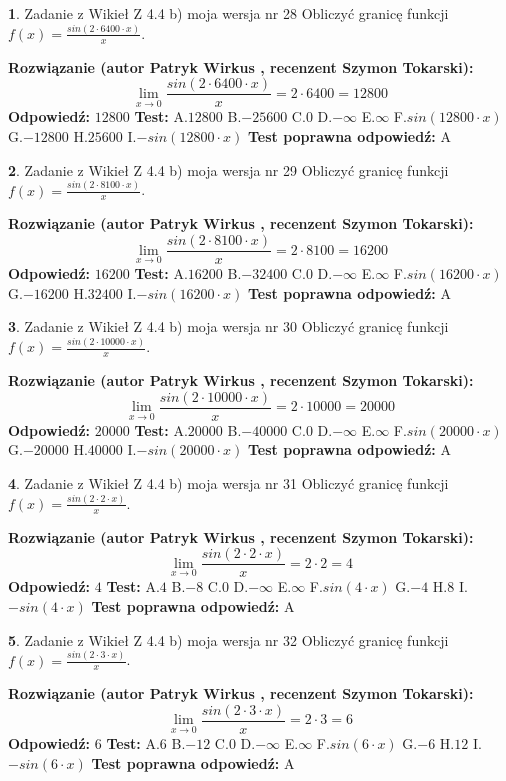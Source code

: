 \documentclass[12pt, a4paper]{article}
\theoremstyle{definition} %
\newtheorem{zad}{}
\newcommand{\zadStart}[1]{\begin{zad}#1\newline}
\newcommand{\zadStop}{\end{zad}}
\newcommand{\rozwStart}[2]{\noindent \textbf{Rozwiązanie (autor #1 , recenzent #2): }\newline}
\newcommand{\rozwStop}{\newline}
\newcommand{\odpStart}{\noindent \textbf{Odpowiedź:}\newline}
\newcommand{\odpStop}{\newline}
\newcommand{\testStart}{\noindent \textbf{Test:}\newline}
\newcommand{\testStop}{\newline}
\newcommand{\kluczStart}{\noindent \textbf{Test poprawna odpowiedź:}\newline}
\newcommand{\kluczStop}{\newline}
\begin{document}
\zadStart{Zadanie z Wikieł Z 4.4 b) moja wersja nr 28}
Obliczyć granicę funkcji $f(x)=\frac{sin(2 \cdot6400\cdot x)}{x}$.
\zadStop
\rozwStart{Patryk Wirkus}{Szymon Tokarski}
$$\lim\limits_{x\to 0}\frac{sin(2 \cdot 6400\cdot x)}{x}=
2 \cdot 6400 = 12800$$
\rozwStop
\odpStart
$12800$
\odpStop
\testStart
A.$12800$
B.$-25600$
C.$0$
D.$-\infty$
E.$\infty$
F.$sin(12800\cdot x)$
G.$-12800$
H.$25600$
I.$-sin(12800\cdot x)$
\testStop
\kluczStart
A
\kluczStop



\zadStart{Zadanie z Wikieł Z 4.4 b) moja wersja nr 29}
Obliczyć granicę funkcji $f(x)=\frac{sin(2 \cdot8100\cdot x)}{x}$.
\zadStop
\rozwStart{Patryk Wirkus}{Szymon Tokarski}
$$\lim\limits_{x\to 0}\frac{sin(2 \cdot 8100\cdot x)}{x}=
2 \cdot 8100 = 16200$$
\rozwStop
\odpStart
$16200$
\odpStop
\testStart
A.$16200$
B.$-32400$
C.$0$
D.$-\infty$
E.$\infty$
F.$sin(16200\cdot x)$
G.$-16200$
H.$32400$
I.$-sin(16200\cdot x)$
\testStop
\kluczStart
A
\kluczStop



\zadStart{Zadanie z Wikieł Z 4.4 b) moja wersja nr 30}
Obliczyć granicę funkcji $f(x)=\frac{sin(2 \cdot10000\cdot x)}{x}$.
\zadStop
\rozwStart{Patryk Wirkus}{Szymon Tokarski}
$$\lim\limits_{x\to 0}\frac{sin(2 \cdot 10000\cdot x)}{x}=
2 \cdot 10000 = 20000$$
\rozwStop
\odpStart
$20000$
\odpStop
\testStart
A.$20000$
B.$-40000$
C.$0$
D.$-\infty$
E.$\infty$
F.$sin(20000\cdot x)$
G.$-20000$
H.$40000$
I.$-sin(20000\cdot x)$
\testStop
\kluczStart
A
\kluczStop



\zadStart{Zadanie z Wikieł Z 4.4 b) moja wersja nr 31}
Obliczyć granicę funkcji $f(x)=\frac{sin(2 \cdot2\cdot x)}{x}$.
\zadStop
\rozwStart{Patryk Wirkus}{Szymon Tokarski}
$$\lim\limits_{x\to 0}\frac{sin(2 \cdot 2\cdot x)}{x}=
2 \cdot 2 = 4$$
\rozwStop
\odpStart
$4$
\odpStop
\testStart
A.$4$
B.$-8$
C.$0$
D.$-\infty$
E.$\infty$
F.$sin(4\cdot x)$
G.$-4$
H.$8$
I.$-sin(4\cdot x)$
\testStop
\kluczStart
A
\kluczStop



\zadStart{Zadanie z Wikieł Z 4.4 b) moja wersja nr 32}
Obliczyć granicę funkcji $f(x)=\frac{sin(2 \cdot3\cdot x)}{x}$.
\zadStop
\rozwStart{Patryk Wirkus}{Szymon Tokarski}
$$\lim\limits_{x\to 0}\frac{sin(2 \cdot 3\cdot x)}{x}=
2 \cdot 3 = 6$$
\rozwStop
\odpStart
$6$
\odpStop
\testStart
A.$6$
B.$-12$
C.$0$
D.$-\infty$
E.$\infty$
F.$sin(6\cdot x)$
G.$-6$
H.$12$
I.$-sin(6\cdot x)$
\testStop
\kluczStart
A
\kluczStop
\end{document}

